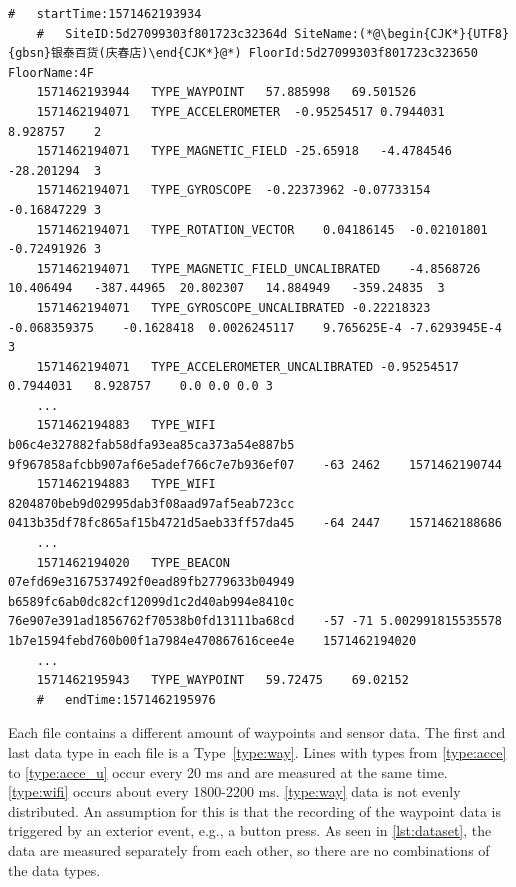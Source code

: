 

\begin{lstlisting}[caption={A snippet from the dataset of the file 5daa9e38df065a00069beb79.txt of the floor F4 of the site with the ID 5d27099303f801723c32364d},label={lst:dataset},captionpos=b]
    #   startTime:1571462193934
    #   SiteID:5d27099303f801723c32364d SiteName:(*@\begin{CJK*}{UTF8}{gbsn}银泰百货(庆春店)\end{CJK*}@*) FloorId:5d27099303f801723c323650 FloorName:4F
    1571462193944   TYPE_WAYPOINT   57.885998   69.501526
    1571462194071   TYPE_ACCELEROMETER  -0.95254517 0.7944031   8.928757    2
    1571462194071   TYPE_MAGNETIC_FIELD -25.65918   -4.4784546  -28.201294  3
    1571462194071   TYPE_GYROSCOPE  -0.22373962 -0.07733154 -0.16847229 3
    1571462194071   TYPE_ROTATION_VECTOR    0.04186145  -0.02101801 -0.72491926 3
    1571462194071   TYPE_MAGNETIC_FIELD_UNCALIBRATED    -4.8568726  10.406494   -387.44965  20.802307   14.884949   -359.24835  3
    1571462194071   TYPE_GYROSCOPE_UNCALIBRATED -0.22218323 -0.068359375    -0.1628418  0.0026245117    9.765625E-4 -7.6293945E-4   3
    1571462194071   TYPE_ACCELEROMETER_UNCALIBRATED -0.95254517 0.7944031   8.928757    0.0 0.0 0.0 3
    ...
    1571462194883   TYPE_WIFI   b06c4e327882fab58dfa93ea85ca373a54e887b5    9f967858afcbb907af6e5adef766c7e7b936ef07    -63 2462    1571462190744
    1571462194883   TYPE_WIFI   8204870beb9d02995dab3f08aad97af5eab723cc    0413b35df78fc865af15b4721d5aeb33ff57da45    -64 2447    1571462188686
    ...
    1571462194020   TYPE_BEACON 07efd69e3167537492f0ead89fb2779633b04949    b6589fc6ab0dc82cf12099d1c2d40ab994e8410c    76e907e391ad1856762f70538b0fd13111ba68cd    -57 -71 5.002991815535578   1b7e1594febd760b00f1a7984e470867616cee4e    1571462194020
    ...
    1571462195943   TYPE_WAYPOINT   59.72475    69.02152
    #   endTime:1571462195976
  \end{lstlisting}
  

Each file contains a different amount of waypoints and sensor data.
The first and last data type in each file is a Type~\ref{type:way}.
Lines with types from \ref{type:acce} to \ref{type:acce_u} occur every 20 ms and are measured at the same time.
\ref{type:wifi} occurs about every 1800-2200 ms.
\ref{type:way} data is not evenly distributed.
An assumption for this is that the recording of the waypoint data is triggered by an exterior event, e.g., a button press.
As seen in \cref{lst:dataset}, the data are measured separately from each other, so there are no combinations of the data types.

